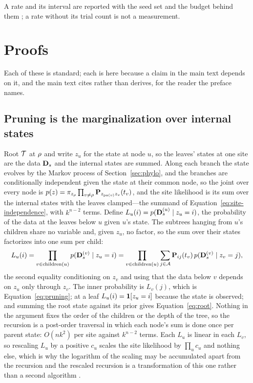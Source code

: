 \documentclass[11pt,a4paper]{article}
\begin{document}
A rate and its interval are reported with the seed set and the budget behind
them \citep{henderson2018, agarwal2021}; a rate without its trial count is not
a measurement.

\section{Proofs}
\label{app:proofs}
\label{app:derivations}

Each of these is standard; each is here because a claim in the main text
depends on it, and the main text cites rather than derives, for the reader
the preface names.

\subsection{Pruning is the marginalization over internal states}
\label{app:pruning}
Root $\mathcal{T}$ at $\rho$ and write $z_u$ for the state at node $u$, so the
leaves' states at one site are the data $\mathbf{D}_s$ and the internal states are
summed. Along each branch the state evolves by the Markov process of
Section~\ref{sec:phylo}, and the branches are conditionally independent given
the state at their common node, so the joint over every node is
$p(z) = \pi_{z_{\rho}} \prod_{v \neq \rho}
\mathbf{P}_{z_{\mathrm{pa}(v)} z_v}(t_v)$, and the site likelihood is its sum over
the internal states with the leaves clamped---the summand of
Equation~\ref{eq:site-independence}, with $k^{n-2}$ terms. Define
$L_u(i) = p(\mathbf{D}_s^{(u)} \mid z_u = i)$, the probability of the data at the
leaves below $u$ given $u$'s state. The subtrees hanging from $u$'s children
share no variable and, given $z_u$, no factor, so the sum over their states
factorizes into one sum per child:
\begin{equation*}
  L_u(i) = \prod_{v \in \mathrm{children}(u)} p(\mathbf{D}_s^{(v)} \mid z_u = i)
         = \prod_{v \in \mathrm{children}(u)} \sum_{j \in \mathcal{A}}
           \mathbf{P}_{ij}(t_v)\, p(\mathbf{D}_s^{(v)} \mid z_v = j),
\end{equation*}
the second equality conditioning on $z_v$ and using that the data below $v$
depends on $z_u$ only through $z_v$. The inner probability is $L_v(j)$, which
is Equation~\ref{eq:pruning}; at a leaf $L_u(i) = \mathbf{1}[z_u = i]$
because the state is observed; and summing the root state against its prior
gives Equation~\ref{eq:root}. Nothing in the argument fixes the order of the
children or the depth of the tree, so the recursion is a post-order traversal
in which each node's sum is done once per parent state: $O(n k^2)$ per site
against $k^{n-2}$ terms. Each $L_u$ is linear in each $L_v$, so rescaling
$L_u$ by a positive $c_u$ scales the site likelihood by $\prod_u c_u$ and
nothing else, which is why the logarithm of the scaling may be accumulated
apart from the recursion and the rescaled recursion is a transformation of
this one rather than a second algorithm
\citep{felsenstein1981, felsenstein2004}.
\end{document}
